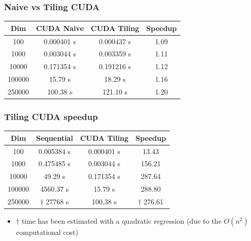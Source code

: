 \documentclass[xcolor=table]{beamer}
\begin{document}
\begin{frame}
\frametitle{Naive vs Tiling CUDA}
\begin{table}[]
\centering
\begin{tabular}{|c|c|c|c|}
\hline
\textbf{Dim} & \textbf{CUDA Naive} & \textbf{CUDA Tiling} & \textbf{Speedup} \\ \hline
100 & 0.000401 s & 0.000437 s & 1.09 \\ \hline
1000 & 0.003044 s & 0.003359 s & 1.11 \\ \hline
10000 & 0.171354 s & 0.191216 s & 1.12 \\ \hline
100000 & 15.79 s & 18.29 s & 1.16 \\ \hline
250000 & 100.38 s & 121.10 s & 1.20 \\ \hline
\end{tabular}
\label{tab:naiveTilingSpeedup}
\end{table}
\end{frame}


\begin{frame}
\frametitle{Tiling CUDA speedup}
\begin{table}[]
\centering
\begin{tabular}{|c|c|c|c|}
\hline
\textbf{Dim} & \textbf{Sequential} & \textbf{CUDA Tiling} & \textbf{Speedup} \\ \hline
100 & 0.005384 s & 0.000401 s & 13.43 \\ \hline
1000 & 0.475485 s & 0.003044 s & 156.21 \\ \hline
10000 & 49.29 s & 0.171354 s & 287.64 \\ \hline
100000 & 4560.37 s & 15.79 s & 288.80 \\ \hline
250000 & $\dagger$ 27768 s & 100.38 s & $\dagger$ 276.61 \\ \hline
\end{tabular}
\label{tab:cudaSpeedup}
\end{table}
\vspace{0.35cm}

\begin{itemize}
\item $\dagger$ time has been estimated with a quadratic regression (due to the $O(n^{2})$ computational cost)
\end{itemize}

\end{frame}
\end{document}
